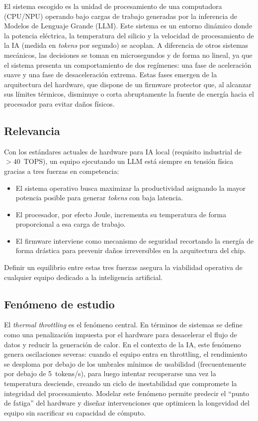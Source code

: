 \documentclass[10pt, twocolumn]{article}
\begin{document}
El sistema escogido es la unidad de procesamiento de una computadora (CPU/NPU)
operando bajo cargas de trabajo generadas por la inferencia de Modelos de
Lenguaje Grande (LLM). Este sistema es un entorno dinámico donde la potencia
eléctrica, la temperatura del silicio y la velocidad de procesamiento de la IA
(medida en \emph{tokens} por segundo) se acoplan. A diferencia de otros sistemas
mecánicos, las decisiones se toman en microsegundos y de forma no lineal, ya que
el sistema presenta un comportamiento de dos regímenes: una fase de aceleración
suave y una fase de desaceleración extrema. Estas fases emergen de la arquitectura
del hardware, que dispone de un firmware protector que, al alcanzar sus límites
térmicos, disminuye o corta abruptamente la fuente de energía hacia el procesador
para evitar daños físicos.

\subsection{Relevancia}

Con los estándares actuales de hardware para IA local (requisito industrial de
$>40$~TOPS), un equipo ejecutando un LLM está siempre en tensión física gracias
a tres fuerzas en competencia:

\begin{itemize}
  \item El sistema operativo busca maximizar la productividad asignando la mayor
        potencia posible para generar \emph{tokens} con baja latencia.
  \item El procesador, por efecto Joule, incrementa su temperatura de forma
        proporcional a esa carga de trabajo.
  \item El firmware interviene como mecanismo de seguridad recortando la energía
        de forma drástica para prevenir daños irreversibles en la arquitectura del chip.
\end{itemize}

Definir un equilibrio entre estas tres fuerzas asegura la viabilidad operativa
de cualquier equipo dedicado a la inteligencia artificial.

\subsection{Fenómeno de estudio}

El \emph{thermal throttling} es el fenómeno central. En términos de sistemas se
define como una penalización impuesta por el hardware para desacelerar el flujo de
datos y reducir la generación de calor. En el contexto de la IA, este fenómeno
genera oscilaciones severas: cuando el equipo entra en throttling, el rendimiento
se desploma por debajo de los umbrales mínimos de usabilidad (frecuentemente por
debajo de 5~tokens/s), para luego intentar recuperarse una vez la temperatura
desciende, creando un ciclo de inestabilidad que compromete la integridad del
procesamiento. Modelar este fenómeno permite predecir el ``punto de fatiga'' del
hardware y diseñar intervenciones que optimicen la longevidad del equipo sin
sacrificar su capacidad de cómputo.
\end{document}
